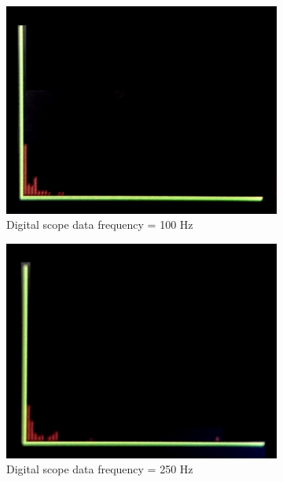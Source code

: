 \documentclass[a4paper]{article}
\newlength{\pic}
\begin{document}
\begin{figure}[htp]
\center
	\begin{subfigure}[H]{\pica}
	\includegraphics[width=\pica]{Images/FFT100}
	\caption{Digital scope data frequency = 100 Hz}
	\end{subfigure}
	\hfill
	\begin{subfigure}[H]{\pica}
	\includegraphics[width=\pica]{Images/FFT250}
	\caption{Digital scope data frequency = 250 Hz}
	\end{subfigure}
	\hfill
	\begin{subfigure}[H]{\pica}

\end{subfigure}
\end{figure}
\end{document}
